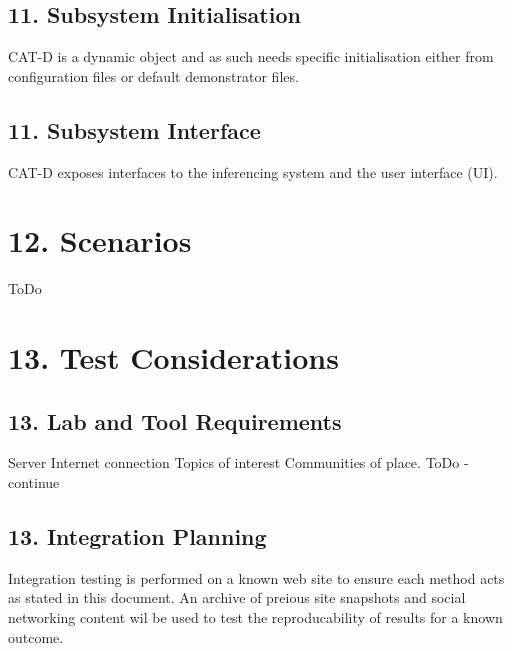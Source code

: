\hypertarget{index_sec_11_2}{}\subsection{11.	\+Subsystem Initialisation}\label{index_sec_11_2}
\begin{DoxyVerb}CAT-D is a dynamic object and as such needs specific initialisation either from configuration files or default demonstrator files.
\end{DoxyVerb}
\hypertarget{index_sec_11_3}{}\subsection{11.	\+Subsystem Interface}\label{index_sec_11_3}
\begin{DoxyVerb}CAT-D exposes interfaces to the inferencing system and the user interface (UI).
\end{DoxyVerb}
\hypertarget{index_sec_12}{}\section{12.	\+Scenarios}\label{index_sec_12}
\begin{DoxyVerb}ToDo
\end{DoxyVerb}
\hypertarget{index_sec_13}{}\section{13.	\+Test Considerations}\label{index_sec_13}
\hypertarget{index_sec_13_1}{}\subsection{13.	\+Lab and Tool Requirements}\label{index_sec_13_1}
\begin{DoxyVerb}Server
Internet connection
Topics of interest
Communities of place.
ToDo - continue
\end{DoxyVerb}
\hypertarget{index_sec_13_2}{}\subsection{13.	\+Integration Planning}\label{index_sec_13_2}
\begin{DoxyVerb}Integration testing is performed on a known web site to ensure each method acts as stated in this document.
An archive of preious site snapshots and social networking content wil be used to test the reproducability of 
results for a known outcome.
\end{DoxyVerb}
